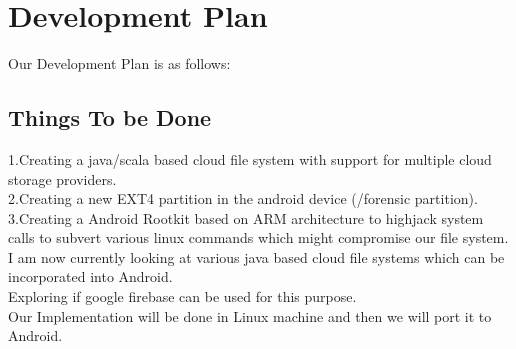 \chapter{Development Plan}
\label{chap:plan}

Our Development Plan is as follows:\\
\section{Things To be Done}
1.Creating a java/scala based cloud file system with support for multiple cloud storage providers.\\
2.Creating a new EXT4 partition in the android device (/forensic partition).\\
3.Creating a Android Rootkit based on ARM architecture to highjack system calls to subvert various linux commands which might compromise our file system.\\

I am now currently looking at various java based cloud file systems which can be incorporated into Android.\\
 
Exploring if google firebase can be used for this purpose.\\

Our Implementation will be done in Linux machine and then we will port it to Android.
